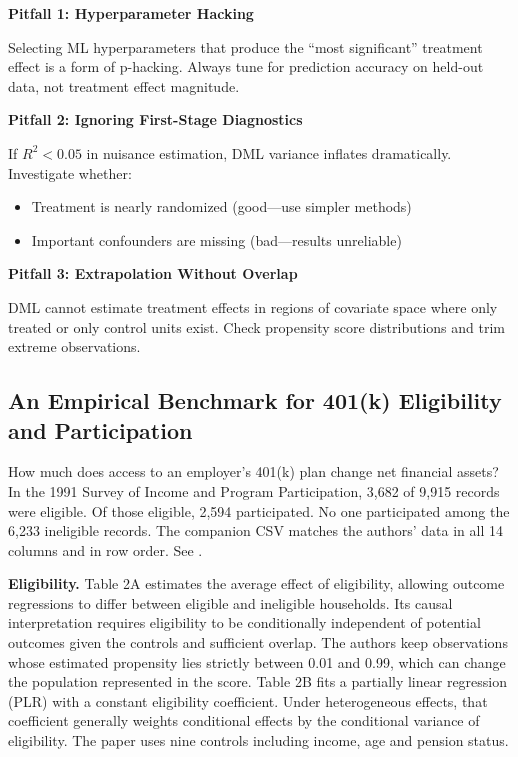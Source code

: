 \textbf{Pitfall 1: Hyperparameter Hacking}

Selecting ML hyperparameters that produce the ``most significant'' treatment effect is a form of p-hacking. Always tune for prediction accuracy on held-out data, not treatment effect magnitude.

\textbf{Pitfall 2: Ignoring First-Stage Diagnostics}

If $R^2 < 0.05$ in nuisance estimation, DML variance inflates dramatically. Investigate whether:
\begin{itemize}
\item Treatment is nearly randomized (good---use simpler methods)
\item Important confounders are missing (bad---results unreliable)
\end{itemize}

\textbf{Pitfall 3: Extrapolation Without Overlap}

DML cannot estimate treatment effects in regions of covariate space where only treated or only control units exist. Check propensity score distributions and trim extreme observations.

\subsection{An Empirical Benchmark for 401(k) Eligibility and Participation}
\label{sec:401k-benchmark}

How much does access to an employer's 401(k) plan change net financial assets? In the 1991 Survey of Income and Program Participation, 3,682 of 9,915 records were eligible. Of those eligible, 2,594 participated. No one participated among the 6,233 ineligible records. The companion CSV matches the authors' data in all 14 columns and in row order. See \cite[Section~6.2, Tables~2--3]{chernozhukov2018double}.

\textbf{Eligibility.} Table 2A estimates the average effect of eligibility, allowing outcome regressions to differ between eligible and ineligible households. Its causal interpretation requires eligibility to be conditionally independent of potential outcomes given the controls and sufficient overlap. The authors keep observations whose estimated propensity lies strictly between 0.01 and 0.99, which can change the population represented in the score. Table 2B fits a partially linear regression (PLR) with a constant eligibility coefficient. Under heterogeneous effects, that coefficient generally weights conditional effects by the conditional variance of eligibility. The paper uses nine controls including income, age and pension status.

